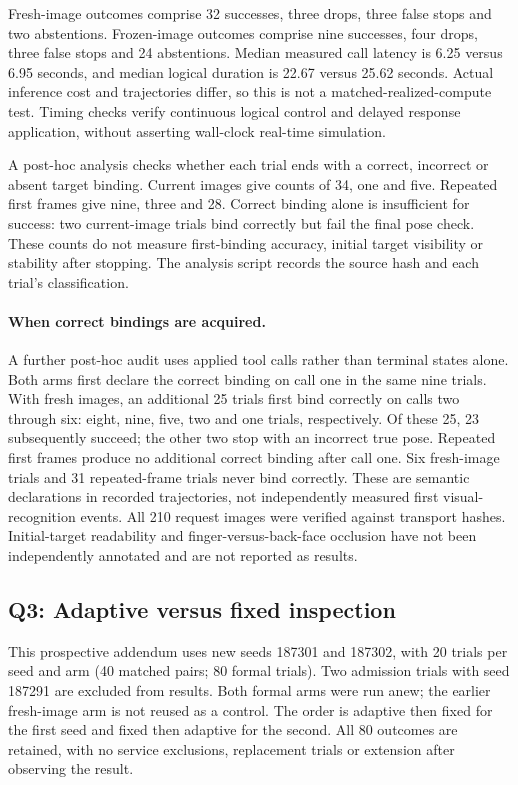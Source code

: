 Fresh-image outcomes comprise 32 successes, three drops, three false stops and two abstentions. Frozen-image outcomes comprise nine successes, four drops, three false stops and 24 abstentions. Median measured call latency is 6.25 versus 6.95 seconds, and median logical duration is 22.67 versus 25.62 seconds. Actual inference cost and trajectories differ, so this is not a matched-realized-compute test. Timing checks verify continuous logical control and delayed response application, without asserting wall-clock real-time simulation.

A post-hoc analysis checks whether each trial ends with a correct, incorrect or absent target binding. Current images give counts of 34, one and five. Repeated first frames give nine, three and 28. Correct binding alone is insufficient for success: two current-image trials bind correctly but fail the final pose check. These counts do not measure first-binding accuracy, initial target visibility or stability after stopping. The analysis script records the source hash and each trial's classification.


\paragraph{When correct bindings are acquired.}
A further post-hoc audit uses applied tool calls rather than terminal states alone. Both arms first declare the correct binding on call one in the same nine trials. With fresh images, an additional 25 trials first bind correctly on calls two through six: eight, nine, five, two and one trials, respectively. Of these 25, 23 subsequently succeed; the other two stop with an incorrect true pose. Repeated first frames produce no additional correct binding after call one. Six fresh-image trials and 31 repeated-frame trials never bind correctly. These are semantic declarations in recorded trajectories, not independently measured first visual-recognition events. All 210 request images were verified against transport hashes. Initial-target readability and finger-versus-back-face occlusion have not been independently annotated and are not reported as results.

\subsection{Q3: Adaptive versus fixed inspection}
\label{sec:inspection-policy}
This prospective addendum uses new seeds 187301 and 187302, with 20 trials per seed and arm (40 matched pairs; 80 formal trials). Two admission trials with seed 187291 are excluded from results. Both formal arms were run anew; the earlier fresh-image arm is not reused as a control. The order is adaptive then fixed for the first seed and fixed then adaptive for the second. All 80 outcomes are retained, with no service exclusions, replacement trials or extension after observing the result.

